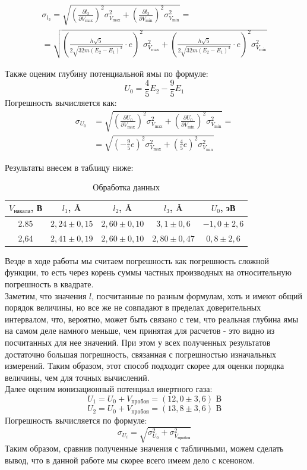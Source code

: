 \documentclass[a4paper,12pt]{extarticle}
\begin{document}
\begin{gather*}
\sigma_{l_3} = \sqrt{\left(\frac{\partial l_3}{\partial V_{\text{max}}}\right)^2 \sigma_{V_{\text{max}}}^2 + \left(\frac{\partial l_3}{\partial V_{\text{min}}}\right)^2 \sigma_{V_{\text{min}}}^2} = \\
= \sqrt{\left(\frac{h\sqrt{5}}{2\sqrt{32m(E_2-E_1)^3}} \cdot e\right)^2 \sigma_{V_{\text{max}}}^2 + \left(\frac{h\sqrt{5}}{2\sqrt{32m(E_2-E_1)^3}} \cdot e\right)^2 \sigma_{V_{\text{min}}}^2}
\end{gather*}

Также оценим глубину потенциальной ямы по формуле:
$$
U_0 = \frac{4}{5}E_2 - \frac{9}{5}E_1
$$
Погрешность вычисляется как:
\begin{align*}
\sigma_{U_0} &= \sqrt{\left(\frac{\partial U_0}{\partial V_{\text{max}}}\right)^2 \sigma_{V_{\text{max}}}^2 + \left(\frac{\partial U_0}{\partial V_{\text{min}}}\right)^2 \sigma_{V_{\text{min}}}^2} = \\
&= \sqrt{\left(-\frac{9}{5}e\right)^2 \sigma_{V_{\text{max}}}^2 + \left(\frac{4}{5}e\right)^2 \sigma_{V_{\text{min}}}^2}
\end{align*}

Результаты внесем в таблицу ниже:
\begin{table}[H]
\centering
{\begin{tabular}{|c|c|c|c|c|}
\hline
$V_\text{накала}$, В & $l_1$, \AA & $l_2$, \AA & $l_3$, \AA & $U_0$, эВ \\ \hline
2.85 & $2,24 \pm 0,15$ & $2,60 \pm 0,10$ & $3,1 \pm 0,6$ & $-1,0 \pm 2,6$ \\ \hline
2,64 & $2,41 \pm 0,19$ & $2,60 \pm 0,10$ & $2,80 \pm 0,47$ & $0,8 \pm 2,6$ \\ \hline
\end{tabular}}
\caption{Обработка данных}
\end{table}
Везде в ходе работы мы считаем погрешность как погрешность сложной функции, то есть через корень суммы частных производных на относительную погрешность в квадрате.\\
Заметим, что значения $l$, посчитанные по разным формулам, хоть и имеют общий порядок величины, но все же не совпадают в пределах доверительных интервалом, что, вероятно, может быть связано с тем, что реальная глубина ямы на самом деле намного меньше, чем принятая для расчетов - это видно из посчитанных для нее значений. При этом у всех полученных результатов достаточно большая погрешность, связанная с погрешностью изначальных измерений. Таким образом, этот способ подходит скорее для оценки порядка величины, чем для точных вычислений.\\
Далее оценим ионизационный потенциал инертного газа:
\[U_1 = U_0 + V_{\text{пробоя}} = (12,0 \pm 3,6) \text{ В}\]
\[U_2 = U_0 + V_{\text{пробоя}} = (13,8 \pm 3,6) \text{ В}\]
Погрешность вычисляется по формуле:
\[
\sigma_{U_i} = \sqrt{\sigma_{U_0}^2 + \sigma_{V_{\text{пробоя}}}^2}
\]
Таким образом, сравнив полученные значения с табличными, можем сделать вывод, что в данной работе мы скорее всего имеем дело с ксеноном.
\end{document}

